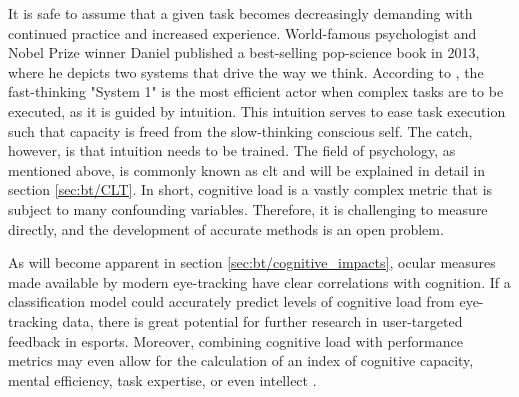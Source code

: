 It is safe to assume that a given task becomes decreasingly demanding with continued practice and increased experience. World-famous psychologist and Nobel Prize winner Daniel \textcite{kahneman2013} published a best-selling pop-science book in 2013, where he depicts two systems that drive the way we think. According to \textcite{kahneman2013}, the fast-thinking "System 1" is the most efficient actor when complex tasks are to be executed, as it is guided by intuition. This intuition serves to ease task execution such that capacity is freed from the slow-thinking conscious self. The catch, however, is that intuition needs to be trained. The field of psychology, as mentioned above, is commonly known as \acrfull{clt} and will be explained in detail in section \ref{sec:bt/CLT}. In short, cognitive load is a vastly complex metric that is subject to many confounding variables. Therefore, it is challenging to measure directly, and the development of accurate methods is an open problem.

As will become apparent in section \ref{sec:bt/cognitive_impacts}, ocular measures made available by modern eye-tracking have clear correlations with cognition. If a classification model could accurately predict levels of cognitive load from eye-tracking data, there is great potential for further research in user-targeted feedback in esports. Moreover, combining cognitive load with performance metrics may even allow for the calculation of an index of cognitive capacity, mental efficiency, task expertise, or even intellect \cite{sweller1998}.



